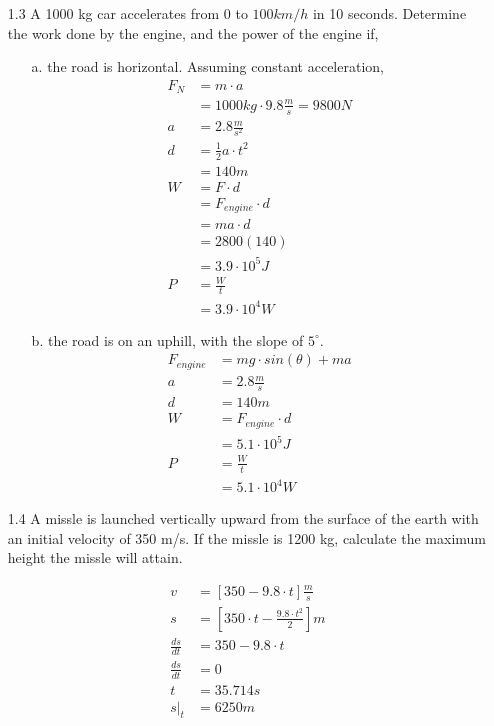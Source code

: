 \documentclass[10pt, a4paper]{article}
\begin{document}
\begin{enumerate}
  \item[1.3] A 1000 kg car accelerates from 0 to $100 km/h$ in 10 seconds. Determine the work done by the engine, and the power of the engine if,
    \begin{enumerate}
      \item[a.] the road is horizontal. Assuming constant acceleration,
        \begin{align}
         F_N &= m \cdot a \\
         &= 1000kg \cdot 9.8\frac{m}{s} = 9800 N \\
         a &= 2.8\frac{m}{s^2} \\
         d &= \frac{1}{2}a\cdot t^2 \\
           &= 140 m \\
         W &= F \cdot d \\
           &= F_{engine} \cdot d \\
           &= ma \cdot d \\
           &= 2800(140) \\
           &= 3.9 \cdot 10^5 J \\
         P &= \frac{W}{t} \\
           &= 3.9 \cdot 10^{4} W
       \end{align}

       \setcounter{equation}{0}

      \item[b.] the road is on an uphill, with the slope of $5^{\circ}$.
        \begin{align}
         F_{engine} &= mg\cdot sin(\theta) + ma \\
         a &= 2.8\frac{m}{s} \\
         d &= 140m \\
         W &= F_{engine} \cdot d \\
         &= 5.1 \cdot 10^5 J \\
         P &= \frac{W}{t} \\
          &= 5.1 \cdot 10^4 W
        \end{align}

    \end{enumerate}
  \item[1.4] A missle is launched vertically upward from the surface of the earth with an initial velocity of 350 m/s. If the missle is 1200 kg, calculate the maximum height the missle will attain.

    \setcounter{equation}{0}
    \begin{align}
      v &= [350 - 9.8\cdot t]\frac{m}{s} \\
      s &= [350\cdot t - \frac{9.8\cdot t^2}{2}]m \\
      \frac{ds}{dt} &= 350 - 9.8 \cdot t \\
      \frac{ds}{dt} &= 0 \\
      t &= 35.714 s \\
      s |_{t} &= 6250m
    \end{align}


\end{enumerate}
\end{document}

